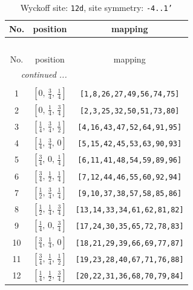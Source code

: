 \documentclass[fleqn,8pt]{jsarticle}
\begin{document}
\begin{longtable}{ccc}
\caption{Wyckoff site: {\tt 12d}, site symmetry: {\tt -4..1'}}
 \\
 \hline \hline
No. & position & mapping \\ \hline \endfirsthead

\multicolumn{2}{l}{\tablename\ \thetable{}} \\
 \hline \hline
No. & position & mapping \\ \hline \endhead

 \hline \hline
\multicolumn{2}{r}{\footnotesize\it continued ...} \\ \endfoot

 \hline \hline
\multicolumn{2}{r}{} \\ \endlastfoot

1 & $\left[ 0,\, \frac{3}{4},\, \frac{1}{4} \right]$ & {\tt [1,8,26,27,49,56,74,75]} \\ \hline
2 & $\left[ 0,\, \frac{1}{4},\, \frac{3}{4} \right]$ & {\tt [2,3,25,32,50,51,73,80]} \\ \hline
3 & $\left[ \frac{1}{4},\, \frac{3}{4},\, \frac{1}{2} \right]$ & {\tt [4,16,43,47,52,64,91,95]} \\ \hline
4 & $\left[ \frac{1}{4},\, \frac{3}{4},\, 0 \right]$ & {\tt [5,15,42,45,53,63,90,93]} \\ \hline
5 & $\left[ \frac{3}{4},\, 0,\, \frac{1}{4} \right]$ & {\tt [6,11,41,48,54,59,89,96]} \\ \hline
6 & $\left[ \frac{3}{4},\, \frac{1}{2},\, \frac{1}{4} \right]$ & {\tt [7,12,44,46,55,60,92,94]} \\ \hline
7 & $\left[ \frac{1}{2},\, \frac{3}{4},\, \frac{1}{4} \right]$ & {\tt [9,10,37,38,57,58,85,86]} \\ \hline
8 & $\left[ \frac{1}{2},\, \frac{1}{4},\, \frac{3}{4} \right]$ & {\tt [13,14,33,34,61,62,81,82]} \\ \hline
9 & $\left[ \frac{1}{4},\, 0,\, \frac{3}{4} \right]$ & {\tt [17,24,30,35,65,72,78,83]} \\ \hline
10 & $\left[ \frac{3}{4},\, \frac{1}{4},\, 0 \right]$ & {\tt [18,21,29,39,66,69,77,87]} \\ \hline
11 & $\left[ \frac{3}{4},\, \frac{1}{4},\, \frac{1}{2} \right]$ & {\tt [19,23,28,40,67,71,76,88]} \\ \hline
12 & $\left[ \frac{1}{4},\, \frac{1}{2},\, \frac{3}{4} \right]$ & {\tt [20,22,31,36,68,70,79,84]} \\
\end{longtable}
\renewcommand{\arraystretch}{1.2}
\end{document}
